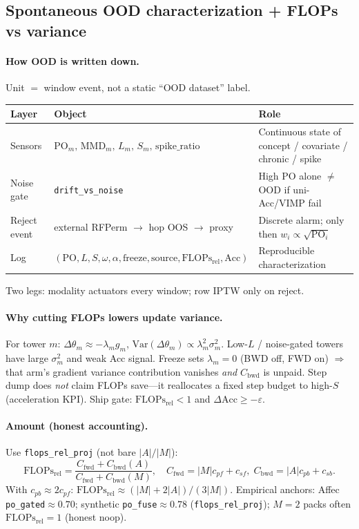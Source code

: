 \documentclass[11pt]{article}
\newcommand{\PO}{\mathrm{PO}}
\newcommand{\Flops}{\mathrm{FLOPs}_{\mathrm{rel}}}
\newcommand{\Acc}{\mathrm{Acc}}
\begin{document}
\subsection{Spontaneous OOD characterization + FLOPs vs variance}
\label{sec:ood-flops}
\paragraph{How OOD is written down.}
Unit $=$ window event, not a static ``OOD dataset'' label.
\begin{center}
\small
\begin{tabular}{@{}llp{4.8cm}@{}}
\toprule
Layer & Object & Role \\
\midrule
Sensors
  & $\PO_m,\,\mathrm{MMD}_m,\,L_m,\,S_m,\,\mathrm{spike\_ratio}$
  & Continuous state of concept / covariate / chronic / spike \\
Noise gate
  & \texttt{drift\_vs\_noise}
  & High $\PO$ alone $\neq$ OOD if uni-Acc/VIMP fail \\
Reject event
  & external RFPerm $\to$ hop OOS $\to$ proxy
  & Discrete alarm; only then $w_i\propto\sqrt{\PO_i}$ \\
Log
  & $(\PO,L,S,\omega,\alpha,\mathrm{freeze},\mathrm{source},\Flops,\Acc)$
  & Reproducible characterization \\
\bottomrule
\end{tabular}
\end{center}
Two legs: modality actuators every window; row IPTW only on reject.

\paragraph{Why cutting FLOPs lowers update variance.}
For tower $m$:
$\Delta\theta_m\approx-\lambda_m g_m$,
$\mathrm{Var}(\Delta\theta_m)\propto\lambda_m^2\sigma_m^2$.
Low-$L$ / noise-gated towers have large $\sigma_m^2$ and weak Acc signal.
Freeze sets $\lambda_m{=}0$ (BWD off, FWD on) $\Rightarrow$ that arm's
gradient variance contribution vanishes \emph{and} $C_{\mathrm{bwd}}$ is unpaid.
Step dump does \emph{not} claim FLOPs save---it reallocates a fixed step
budget to high-$S$ (acceleration KPI).
Ship gate: $\Flops{<}1$ and $\Delta\Acc\ge-\varepsilon$.

\paragraph{Amount (honest accounting).}
Use \texttt{flops\_rel\_proj} (not bare $|A|/|M|$):
\[
\Flops
=
\frac{C_{\mathrm{fwd}}+C_{\mathrm{bwd}}(A)}{C_{\mathrm{fwd}}+C_{\mathrm{bwd}}(M)},
\quad
C_{\mathrm{fwd}}=|M|c_{pf}+c_{sf},\;
C_{\mathrm{bwd}}=|A|c_{pb}+c_{sb}.
\]
With $c_{pb}\approx 2c_{pf}$: $\Flops\approx(|M|+2|A|)/(3|M|)$.
Empirical anchors: Affec \texttt{po\_gated}$\approx0.70$;
synthetic \texttt{po\_fuse}$\approx0.78$ (\texttt{flops\_rel\_proj});
$M{=}2$ packs often $\Flops{=}1$ (honest noop).
\end{document}
